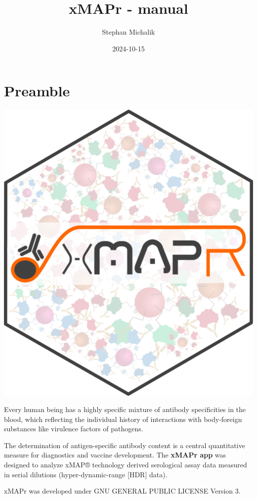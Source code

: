 \documentclass[
]{book}
\title{xMAPr - manual}
\author{Stephan Michalik}
\date{2024-10-15}
\begin{document}
\maketitle

{
\setcounter{tocdepth}{1}
\tableofcontents
}
\chapter{Preamble}\label{preamble}

\includegraphics[width=7.07in]{figures/xMAPr_logo_mod_hexbin}

Every human being has a highly specific mixture of antibody specificities in the blood, which reflecting the individual history of interactions with body-foreign substances like virulence factors of pathogens.

The determination of antigen-specific antibody content is a central quantitative measure for diagnostics and vaccine development. The \textbf{xMAPr app} was designed to analyze xMAP® technology derived serological assay data measured in serial dilutions (hyper-dynamic-range {[}HDR{]} data).

xMAPr was developed under GNU GENERAL PUBLIC LICENSE Version 3.
\end{document}
